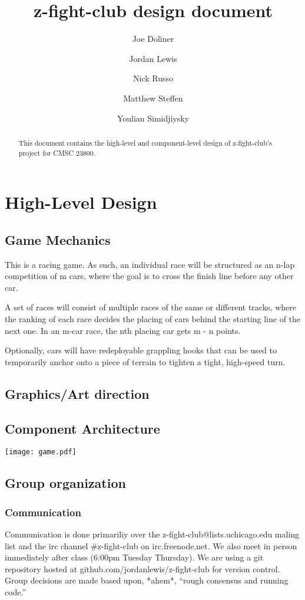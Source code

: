 \documentclass[12pt]{article}
\title{z-fight-club design document}
\author{Joe Doliner \and Jordan Lewis \and Nick Russo \and Matthew Steffen \and Youlian Simidjiysky}
\begin{document}
 \maketitle
\begin{abstract}
This document contains the high-level and component-level design of
z-fight-club's project for CMSC 23800.
\end{abstract}
\section{High-Level Design}
\subsection{Game Mechanics}
This is a racing game. As such, an individual race will be structured as
an n-lap competition of m cars, where the goal is to cross the finish line
before any other car.

A set of races will consist of multiple races of the same or different tracks,
where the ranking of each race decides the placing of cars behind the starting
line of the next one. In an m-car race, the nth placing car gets m - n points.

Optionally, cars will have redeployable grappling hooks that can be used to
temporarily anchor onto a piece of terrain to tighten a tight, high-speed turn.
\subsection{Graphics/Art direction}

\subsection{Component Architecture}
\texttt{[image: game.pdf]}

\subsection{Group organization}
\subsubsection{Communication}
Communication is done primariliy over the z-fight-club@lists.uchicago.edu maling list and the irc channel \#z-fight-club on irc.freenode.net.  We also meet in person immediately after class (6:00pm Tuesday Thursday).  We are using a git repository hosted at github.com/jordanlewis/z-fight-club for version control.  Group decisions are made based upon, *ahem*, ``rough consensus and running code.''
\end{document}

